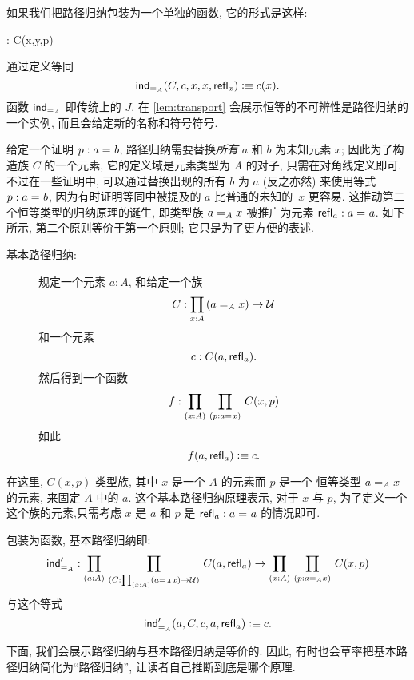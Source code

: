 如果我们把路径归纳包装为一个单独的函数, 它的形式是这样: %
\begin{narrowmultline*}
 : 
 \to 
\narrowbreak
{} C(x,y,p)
\end{narrowmultline*}
通过定义等同 \[ \indid{A}(C,c,x,x,\refl{x}) \defeq c(x). \]
函数 $ \indid{A}$ 即传统上的 $J$. %
在 \cref{lem:transport} 会展示恒等的不可辨性是路径归纳的一个实例, 而且会给定新的名称和符号符号. 

\mentalpause

给定一个证明 $p : \id{a}{b}$, 路径归纳需要替换\emph{所有} $a$ 和 $b$ 为未知元素 $x$; 因此为了构造族 $C$ 的一个元素, 它的定义域是元素类型为 $A$ 的对子, 只需在对角线定义即可. 不过在一些证明中, 可以通过替换出现的所有 $b$ 为 $a$ (反之亦然) 来使用等式 $p : \id{a}{b}$, 因为有时证明等同中被提及的 $a$ 比普通的未知的~$x$ 更容易. 这推动第二个恒等类型的归纳原理的诞生, 即类型族 $\id[A]{a}{x}$ 被推广为元素 $\refl{a} : \id{a}{a}$. 如下所示, 第二个原则等价于第一个原则; 它只是为了更方便的表述. 

%
%
\begin{description}
\item[基本路径归纳:] 
规定一个元素 $a:A$, 和给定一个族
\[ C : \prd{x:A} (\id[A]{a}{x}) \to \UU \]
和一个元素
\[ c : C(a,\refl{a}). \]
然后得到一个函数
\[ f : \prd{x:A}{p:\id{a}{x}} C(x,p) \]
如此
\[ f(a,\refl{a}) \defeq c.\]
\end{description}

在这里, $C(x,p)$ 类型族,  其中 $x$ 是一个 $A$ 的元素而 $p$ 是一个 恒等类型 $\id[A]{a}{x}$ 的元素, 来固定 $A$ 中的 $a$. 这个基本路径归纳原理表示, 对于 $x$ 与 $p$, 为了定义一个这个族的元素,只需考虑 $x$ 是 $a$ 和 $p$ 是 $\refl{a} : \id{a}{a}$ 的情况即可. 

包装为函数, 基本路径归纳即: %
\begin{align*}
\indidb{A} : \dprd{a:A}{C : \prd{x:A} (\id[A]{a}{x}) \to \UU}
C(a,\refl{a}) \to \dprd{x:A}{p : \id[A]{a}{x}} C(x,p) 
\end{align*}
与这个等式 \[ \indidb{A}(a,C,c,a,\refl{a}) \defeq c. \]

下面, 我们会展示路径归纳与基本路径归纳是等价的. 因此, 有时也会草率把基本路径归纳简化为``路径归纳'', 让读者自己推断到底是哪个原理. 

